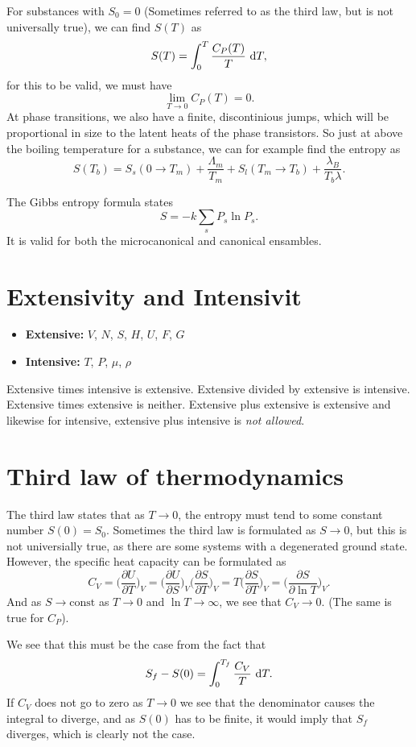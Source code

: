 \documentclass[a4paper, 11pt, notitlepage, english]{article}
\renewcommand{\d}{{\rm d}}
\newcommand{\p}{\partial}
\begin{document}
For substances with $S_0 = 0$ (Sometimes referred to as the third law, but is not universally true), we can find $S(T)$ as
$$S(T) = \int_0^T \frac{C_{P}(T)}{T} \ \d T,$$
for this to be valid, we must have 
$$\lim_{T \to 0} C_P(T) = 0.$$
At phase transitions, we also have a finite, discontinious jumps, which will be proportional in size to the latent heats of the phase transistors. So just at above the boiling temperature for a substance, we can for example find the entropy as
$$S(T_b) = S_s(0\to T_m) + \frac{\Lambda_m}{T_m} + S_l(T_m \to T_b) + \frac{\lambda_B}{T_b\lambda}.$$

The Gibbs entropy formula states
$$S = -k \sum_s P_s \ln P_s.$$
It is valid for both the microcanonical and canonical ensambles.

\clearpage

\section*{Extensivity and Intensivit}
\begin{itemize}
	\item \textbf{Extensive:} $V$, $N$, $S$, $H$, $U$, $F$, $G$ 
	\item \textbf{Intensive:} $T$, $P$, $\mu$, $\rho$
\end{itemize}
Extensive times intensive is extensive. Extensive divided by extensive is intensive. Extensive times extensive is neither. Extensive plus extensive is extensive and likewise for intensive, extensive plus intensive is \emph{not allowed}.

\clearpage

\section*{Third law of thermodynamics}
 
The third law states that as $T \to 0$, the entropy must tend to some constant number $S(0) = S_0$. Sometimes the third law is formulated as $S\to0$, but this is not universially true, as there are some systems with a degenerated ground state. However, the specific heat capacity can be formulated as
$$C_V = \bigg(\frac{\p U}{\p T}\bigg)_V = \bigg(\frac{\p U}{\p S}\bigg)_V\bigg(\frac{\p S}{\p T}\bigg)_V = T\bigg(\frac{\p S}{\p T}\bigg)_V = \bigg(\frac{\p S}{\p \ln T} \bigg)_V.$$
And as $S \to \mbox{const}$ as $T \to 0$ and $\ln T \to \infty$, we see that $C_V \to 0$. (The same is true for $C_P$).

We see that this must be the case from the fact that
$$S_f - S(0) = \int_0^{T_{f}} \frac{C_V}{T} \ \d T.$$
If $C_V$ does not go to zero as $T \to 0$ we see that the denominator causes the integral to diverge, and as $S(0)$ has to be finite, it would imply that $S_f$ diverges, which is clearly not the case.
\end{document}
